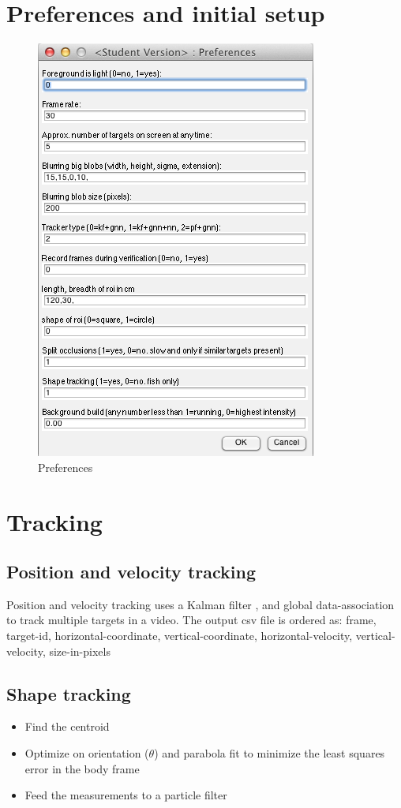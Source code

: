 \documentclass[12pt]{article}
\begin{document}
\section{Preferences and initial setup}
\begin{figure}[h]
\centering
\includegraphics[width=.495\linewidth]{prefs}
\caption{Preferences}
\label{fig:prefs}
\end{figure}

\section{Tracking}

\subsection{Position and velocity tracking}
Position and velocity tracking uses a Kalman filter \cite{BarShalom1987}, and global data-association \cite{Kuhn1955} to track multiple targets in a video. The output csv file is ordered as: frame, target-id, horizontal-coordinate, vertical-coordinate, horizontal-velocity, vertical-velocity, size-in-pixels 

\subsection{Shape tracking}
\begin{itemize}
\item Find the centroid
\item Optimize on orientation ($\theta$) and parabola fit to minimize the least squares error in the body frame
\item Feed the measurements to a particle filter
\end{itemize}
\end{document}
